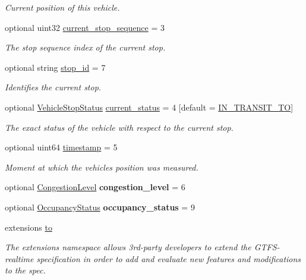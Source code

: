 \begin{DoxyCompactItemize}
\begin{DoxyCompactList}\small\item\em Current position of this vehicle. \end{DoxyCompactList}\item 
optional uint32 \hyperlink{structVehiclePosition_a2fde6125d13fbc9fabc8f48eada1d038}{current\+\_\+stop\+\_\+sequence} = 3
\begin{DoxyCompactList}\small\item\em The stop sequence index of the current stop. \end{DoxyCompactList}\item 
optional string \hyperlink{structVehiclePosition_a4b7ba68aab943efc93017657f40867f9}{stop\+\_\+id} = 7
\begin{DoxyCompactList}\small\item\em Identifies the current stop. \end{DoxyCompactList}\item 
optional \hyperlink{structVehiclePosition_a59db950a979338c8c299fdd5b8383c6e}{Vehicle\+Stop\+Status} \hyperlink{structVehiclePosition_ad900e7ee70d8271d8fd096233b0560f3}{current\+\_\+status} = 4 \mbox{[}default = \hyperlink{structVehiclePosition_a59db950a979338c8c299fdd5b8383c6eaa348824abc51d4c2aa2c45fd0c05dc14}{I\+N\+\_\+\+T\+R\+A\+N\+S\+I\+T\+\_\+\+TO}\mbox{]}
\begin{DoxyCompactList}\small\item\em The exact status of the vehicle with respect to the current stop. \end{DoxyCompactList}\item 
optional uint64 \hyperlink{structVehiclePosition_acb63a32840849447f6a4dfd2f74f1907}{timestamp} = 5
\begin{DoxyCompactList}\small\item\em Moment at which the vehicle\textquotesingle{}s position was measured. \end{DoxyCompactList}\item 
optional \hyperlink{structVehiclePosition_a6b68a02175508df528c0fb3dfc52c7c5}{Congestion\+Level} {\bfseries congestion\+\_\+level} = 6\hypertarget{structVehiclePosition_a3d06be45e04dd3d342b169c130e15470}{}\label{structVehiclePosition_a3d06be45e04dd3d342b169c130e15470}

\item 
optional \hyperlink{structVehiclePosition_a3b7e3ee1e916599ecb7fd088d4f53f0d}{Occupancy\+Status} {\bfseries occupancy\+\_\+status} = 9\hypertarget{structVehiclePosition_a9a97158749e519f16014ba53973fb1fe}{}\label{structVehiclePosition_a9a97158749e519f16014ba53973fb1fe}

\item 
extensions \hyperlink{structVehiclePosition_a84bafc1fa0f1b48ed586343427f6aed7}{to}
\begin{DoxyCompactList}\small\item\em The extensions namespace allows 3rd-\/party developers to extend the G\+T\+F\+S-\/realtime specification in order to add and evaluate new features and modifications to the spec. \end{DoxyCompactList}\end{DoxyCompactItemize}


